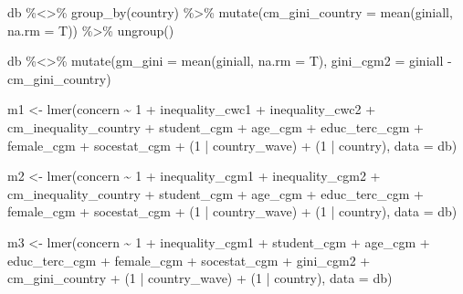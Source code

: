 \documentclass[
  12pt,
  a4paper,
]{article}
\newenvironment{Shaded}{\begin{snugshade}}{\end{snugshade}}
\newcommand{\AttributeTok}[1]{\textcolor[rgb]{0.77,0.63,0.00}{#1}}
\newcommand{\DecValTok}[1]{\textcolor[rgb]{0.00,0.00,0.81}{#1}}
\newcommand{\FunctionTok}[1]{\textcolor[rgb]{0.00,0.00,0.00}{#1}}
\newcommand{\NormalTok}[1]{#1}
\newcommand{\OtherTok}[1]{\textcolor[rgb]{0.56,0.35,0.01}{#1}}
\newcommand{\SpecialCharTok}[1]{\textcolor[rgb]{0.00,0.00,0.00}{#1}}
\begin{document}
\begin{Shaded}
\begin{Highlighting}[]
\NormalTok{db }\SpecialCharTok{\%\textless{}\textgreater{}\%} 
  \FunctionTok{group\_by}\NormalTok{(country) }\SpecialCharTok{\%\textgreater{}\%}
  \FunctionTok{mutate}\NormalTok{(}\AttributeTok{cm\_gini\_country =} \FunctionTok{mean}\NormalTok{(giniall, }\AttributeTok{na.rm =}\NormalTok{ T)) }\SpecialCharTok{\%\textgreater{}\%} 
  \FunctionTok{ungroup}\NormalTok{()}

\NormalTok{db }\SpecialCharTok{\%\textless{}\textgreater{}\%} 
  \FunctionTok{mutate}\NormalTok{(}\AttributeTok{gm\_gini =} \FunctionTok{mean}\NormalTok{(giniall, }\AttributeTok{na.rm =}\NormalTok{ T),}
         \AttributeTok{gini\_cgm2 =}\NormalTok{ giniall }\SpecialCharTok{{-}}\NormalTok{ cm\_gini\_country)}


\NormalTok{m1 }\OtherTok{\textless{}{-}} \FunctionTok{lmer}\NormalTok{(concern }\SpecialCharTok{\textasciitilde{}} \DecValTok{1} \SpecialCharTok{+}\NormalTok{ inequality\_cwc1 }\SpecialCharTok{+}\NormalTok{ inequality\_cwc2 }\SpecialCharTok{+}\NormalTok{ cm\_inequality\_country }\SpecialCharTok{+}\NormalTok{ student\_cgm }\SpecialCharTok{+}\NormalTok{ age\_cgm }\SpecialCharTok{+}\NormalTok{ educ\_terc\_cgm }\SpecialCharTok{+}\NormalTok{ female\_cgm }\SpecialCharTok{+}\NormalTok{ socestat\_cgm }\SpecialCharTok{+}\NormalTok{ (}\DecValTok{1} \SpecialCharTok{|}\NormalTok{ country\_wave) }\SpecialCharTok{+}\NormalTok{ (}\DecValTok{1} \SpecialCharTok{|}\NormalTok{ country), }\AttributeTok{data =}\NormalTok{ db)}

\NormalTok{m2 }\OtherTok{\textless{}{-}} \FunctionTok{lmer}\NormalTok{(concern }\SpecialCharTok{\textasciitilde{}} \DecValTok{1} \SpecialCharTok{+}\NormalTok{ inequality\_cgm1 }\SpecialCharTok{+}\NormalTok{ inequality\_cgm2 }\SpecialCharTok{+}\NormalTok{ cm\_inequality\_country }\SpecialCharTok{+}\NormalTok{ student\_cgm }\SpecialCharTok{+}\NormalTok{ age\_cgm }\SpecialCharTok{+}\NormalTok{ educ\_terc\_cgm }\SpecialCharTok{+}\NormalTok{ female\_cgm }\SpecialCharTok{+}\NormalTok{ socestat\_cgm }\SpecialCharTok{+}\NormalTok{ (}\DecValTok{1} \SpecialCharTok{|}\NormalTok{ country\_wave) }\SpecialCharTok{+}\NormalTok{ (}\DecValTok{1} \SpecialCharTok{|}\NormalTok{ country), }\AttributeTok{data =}\NormalTok{ db)}

\NormalTok{m3 }\OtherTok{\textless{}{-}} \FunctionTok{lmer}\NormalTok{(concern }\SpecialCharTok{\textasciitilde{}} \DecValTok{1} \SpecialCharTok{+}\NormalTok{ inequality\_cgm1 }\SpecialCharTok{+}\NormalTok{ student\_cgm }\SpecialCharTok{+}\NormalTok{ age\_cgm }\SpecialCharTok{+}\NormalTok{ educ\_terc\_cgm }\SpecialCharTok{+}\NormalTok{ female\_cgm }\SpecialCharTok{+}\NormalTok{ socestat\_cgm }\SpecialCharTok{+}\NormalTok{ gini\_cgm2 }\SpecialCharTok{+}\NormalTok{ cm\_gini\_country }\SpecialCharTok{+}\NormalTok{ (}\DecValTok{1} \SpecialCharTok{|}\NormalTok{ country\_wave) }\SpecialCharTok{+}\NormalTok{ (}\DecValTok{1} \SpecialCharTok{|}\NormalTok{ country), }\AttributeTok{data =}\NormalTok{ db)}



\end{Highlighting}
\end{Shaded}
\end{document}
